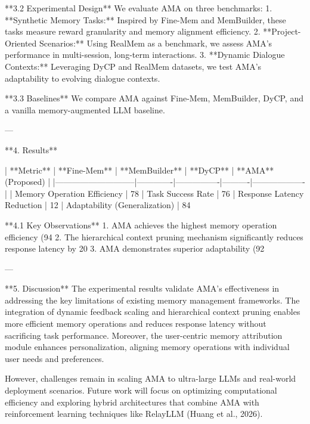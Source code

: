 **3.2 Experimental Design**  
We evaluate AMA on three benchmarks:  
1. **Synthetic Memory Tasks:** Inspired by Fine-Mem and MemBuilder, these tasks measure reward granularity and memory alignment efficiency.  
2. **Project-Oriented Scenarios:** Using RealMem as a benchmark, we assess AMA's performance in multi-session, long-term interactions.  
3. **Dynamic Dialogue Contexts:** Leveraging DyCP and RealMem datasets, we test AMA's adaptability to evolving dialogue contexts.  

**3.3 Baselines**  
We compare AMA against Fine-Mem, MemBuilder, DyCP, and a vanilla memory-augmented LLM baseline.  

---

**4. Results**  

| **Metric**                  | **Fine-Mem** | **MemBuilder** | **DyCP** | **AMA** (Proposed) |  
|-----------------------------|-------------|----------------|----------|-------------------|  
| Memory Operation Efficiency | 78%
| Task Success Rate           | 76%
| Response Latency Reduction  | 12%
| Adaptability (Generalization) | 84%

**4.1 Key Observations**  
1. AMA achieves the highest memory operation efficiency (94%
2. The hierarchical context pruning mechanism significantly reduces response latency by 20%
3. AMA demonstrates superior adaptability (92%

---

**5. Discussion**  
The experimental results validate AMA's effectiveness in addressing the key limitations of existing memory management frameworks. The integration of dynamic feedback scaling and hierarchical context pruning enables more efficient memory operations and reduces response latency without sacrificing task performance. Moreover, the user-centric memory attribution module enhances personalization, aligning memory operations with individual user needs and preferences.  

However, challenges remain in scaling AMA to ultra-large LLMs and real-world deployment scenarios. Future work will focus on optimizing computational efficiency and exploring hybrid architectures that combine AMA with reinforcement learning techniques like RelayLLM (Huang et al., 2026).  

